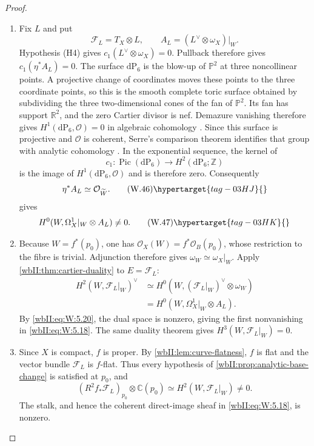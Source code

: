 \begin{proof}

\begin{enumerate}[label=\arabic*.,leftmargin=*]
\item Fix $L$ and put
\[
\mathcal F_L=T_X\otimes L,\qquad
A_L=(L^\vee\otimes\omega_X)|_W.
\]
Hypothesis (H4) gives $c_1(L^\vee\otimes\omega_X)=0$.  Pullback therefore
gives $c_1(\eta^*A_L)=0$. The surface $\mathrm{dP}_6$ is the blow-up of
$\mathbb P^2$ at three noncollinear points. A projective change of coordinates
moves these points to the three coordinate points, so this is the smooth
complete toric surface obtained by subdividing the three two-dimensional
cones of the fan of $\mathbb P^2$. Its fan has support $\mathbb R^2$,
and the zero Cartier divisor is nef. Demazure vanishing therefore gives
$H^1(\mathrm{dP}_6,\mathcal O)=0$ in algebraic cohomology
\cite[Theorem~9.2.3, 2010 text, p.~410]{CoxLittleSchenck2011}.
Since this surface is projective and $\mathcal O$ is coherent,
Serre's comparison theorem identifies that group with analytic cohomology
\cite[\S12, Theorem~1, p.~19]{Serre1956GAGA}.
In the exponential sequence, the kernel
of
\[
c_1:\operatorname{Pic}(\mathrm{dP}_6)\longrightarrow
H^2(\mathrm{dP}_6;\mathbb Z)
\]
is the image of $H^1(\mathrm{dP}_6,\mathcal O)$ and is therefore zero.
Consequently
\[
\eta^*A_L\simeq\mathcal O_{\widetilde W}.
\tag{W.46}\hypertarget{tag-03HJ}{}\label{wbII:eq:W:5.19}
\]
 gives
\[
H^0(W,\Omega^1_X|_W\otimes A_L)\ne0.
\tag{W.47}\hypertarget{tag-03HK}{}\label{wbII:eq:W:5.20}
\]

\item Because $W=f^*(p_0)$, one has
$\mathcal O_X(W)=f^*\mathcal O_B(p_0)$, whose restriction to the fibre is
trivial.  Adjunction therefore gives $\omega_W\simeq\omega_X|_W$.
Apply \cref{wbII:thm:cartier-duality} to $E=\mathcal F_L$:
\[
\begin{split}
H^2(W,\mathcal F_L|_W)^\vee
&\simeq H^0(W,(\mathcal F_L|_W)^\vee\otimes\omega_W)\\
&=H^0(W,\Omega^1_X|_W\otimes A_L).
\end{split}
\]
By \eqref{wbII:eq:W:5.20}, the dual space is nonzero, giving the first nonvanishing in \eqref{wbII:eq:W:5.18}.
The same duality theorem gives
$H^3(W,\mathcal F_L|_W)=0$.

\item Since $X$ is compact, $f$ is proper.  By
\cref{wbII:lem:curve-flatness}, $f$ is flat and the vector bundle
$\mathcal F_L$ is $f$-flat.  Thus every hypothesis of
\cref{wbII:prop:analytic-base-change} is satisfied at $p_0$, and
\[
(R^2f_*\mathcal F_L)_{p_0}\otimes\mathbb C(p_0)
\simeq H^2(W,\mathcal F_L|_W)\ne0.
\]
The stalk, and hence the coherent direct-image sheaf in
\eqref{wbII:eq:W:5.18}, is nonzero.

\end{enumerate}
\end{proof}